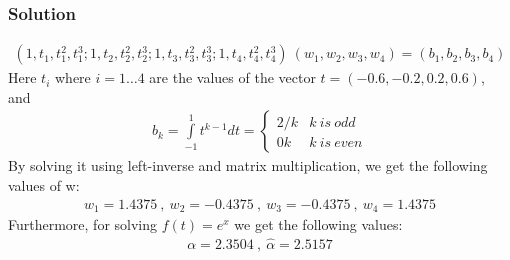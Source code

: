 \documentclass{article}
\begin{document}
\subsubsection*{Solution}
\begin{align*}
    (1,t_1,t^2_1,t^3_1;1,t_2,t^2_2,t^3_2;1,t_3,t^2_3,t^3_3;1,t_4,t^2_4,t^3_4)\ (w_1,w_2,w_3,w_4) = (b_1,b_2,b_3,b_4)
\end{align*}
Here $t_i$ where $i=1\ldots 4$ are the values of the vector $t=(-0.6, -0.2, 0.2, 0.6)$, and 
\begin{align*}
    b_k = \int\limits_{-1}^{1} t^{k-1}dt = \begin{cases}
  2/k & k\ is\ odd\\    
  0 k & k\ is\ even
\end{cases}
\end{align*}
By solving it using left-inverse and matrix multiplication, we get the following values of w:
\begin{align*}
    w_1 = 1.4375\ ,\ w_2 = -0.4375\ ,\ w_3=-0.4375\ ,\ w_4=1.4375
\end{align*}
Furthermore, for solving $f(t)=e^x$ we get the following values:
\begin{align*}
    \alpha = 2.3504\ ,\ \hat{\alpha}=2.5157
\end{align*}
\end{document}
